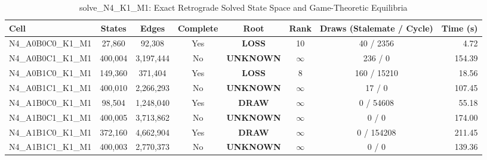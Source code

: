 \begin{table}[htbp]
\centering
\caption{solve\_N4\_K1\_M1: Exact Retrograde Solved State Space and Game-Theoretic Equilibria}
\label{tab:exact_solves}
\begin{tabular}{lccccccr}
\toprule
Cell & States & Edges & Complete & Root & Rank & Draws (Stalemate / Cycle) & Time (s) \\
\midrule
N4\_A0B0C0\_K1\_M1 & 27,860 & 92,308 & Yes & \textbf{LOSS} & 10 & 40 / 2356 & 4.72 \\
N4\_A0B0C1\_K1\_M1 & 400,004 & 3,197,444 & No & \textbf{UNKNOWN} & $\infty$ & 236 / 0 & 154.39 \\
N4\_A0B1C0\_K1\_M1 & 149,360 & 371,404 & Yes & \textbf{LOSS} & 8 & 160 / 15210 & 18.56 \\
N4\_A0B1C1\_K1\_M1 & 400,010 & 2,266,293 & No & \textbf{UNKNOWN} & $\infty$ & 17 / 0 & 107.45 \\
N4\_A1B0C0\_K1\_M1 & 98,504 & 1,248,040 & Yes & \textbf{DRAW} & $\infty$ & 0 / 54608 & 55.18 \\
N4\_A1B0C1\_K1\_M1 & 400,005 & 3,713,862 & No & \textbf{UNKNOWN} & $\infty$ & 0 / 0 & 174.00 \\
N4\_A1B1C0\_K1\_M1 & 372,160 & 4,662,904 & Yes & \textbf{DRAW} & $\infty$ & 0 / 154208 & 211.45 \\
N4\_A1B1C1\_K1\_M1 & 400,003 & 2,770,373 & No & \textbf{UNKNOWN} & $\infty$ & 0 / 0 & 139.36 \\
\bottomrule
\end{tabular}
\end{table}
